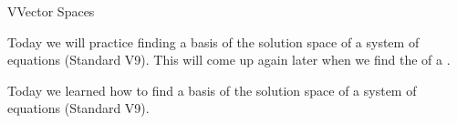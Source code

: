 \begin{module}{V}{Vector Spaces}
\newModuleSection
\begin{goals}
Today we will practice finding a basis of the solution space of a  system of equations (Standard V9).  This will come up again later when we find the  of a .
\end{goals}
\begin{summary}
Today we learned how to find a basis of the solution space of a  system of equations (Standard V9).
\end{summary}


\end{module}
